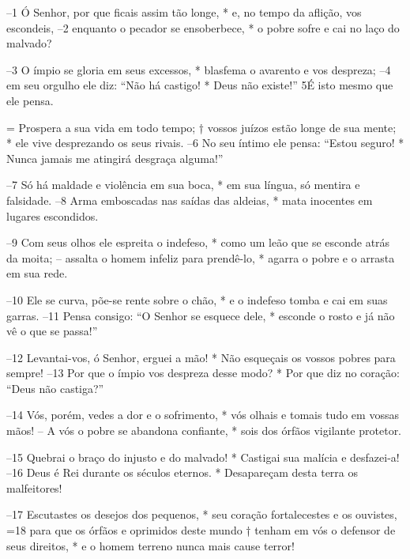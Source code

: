 –1 Ó Senhor, por que ficais assim tão longe, *
e, no tempo da aflição, vos escondeis,
–2 enquanto o pecador se ensoberbece, *
o pobre sofre e cai no laço do malvado?

–3 O ímpio se gloria em seus excessos, *
blasfema o avarento e vos despreza;
–4 em seu orgulho ele diz: “Não há castigo! *
Deus não existe!”  5É isto mesmo que ele pensa.

= Prospera a sua vida em todo tempo; †
vossos juízos estão longe de sua mente; *
ele vive desprezando os seus rivais.
–6 No seu íntimo ele pensa: “Estou seguro! *
Nunca jamais me atingirá desgraça alguma!”

–7 Só há maldade e violência em sua boca, *
em sua língua, só mentira e falsidade.
–8 Arma emboscadas nas saídas das aldeias, *
mata inocentes em lugares escondidos.

–9 Com seus olhos ele espreita o indefeso, *
como um leão que se esconde atrás da moita;
– assalta o homem infeliz para prendê-lo, *
agarra o pobre e o arrasta em sua rede.

–10 Ele se curva, põe-se rente sobre o chão, *
e o indefeso tomba e cai em suas garras.
–11 Pensa consigo: “O Senhor se esquece dele, *
esconde o rosto e já não vê o que se passa!”

–12 Levantai-vos, ó Senhor, erguei a mão! *
Não esqueçais os vossos pobres para sempre!
–13 Por que o ímpio vos despreza desse modo? *
Por que diz no coração: “Deus não castiga?”

–14 Vós, porém, vedes a dor e o sofrimento, *
vós olhais e tomais tudo em vossas mãos!
– A vós o pobre se abandona confiante, *
sois dos órfãos vigilante protetor.

–15 Quebrai o braço do injusto e do malvado! *
Castigai sua malícia e desfazei-a!
–16 Deus é Rei durante os séculos eternos. *
Desapareçam desta terra os malfeitores!

–17 Escutastes os desejos dos pequenos, *
seu coração fortalecestes e os ouvistes,
=18 para que os órfãos e oprimidos deste mundo †
tenham em vós o defensor de seus direitos, *
e o homem terreno nunca mais cause terror!